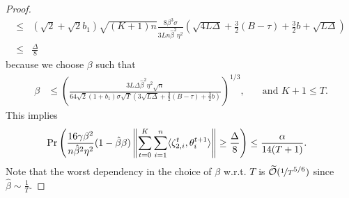 \documentclass[a4paper,11pt]{article}
\begin{document}
\begin{proof}
\begin{align*}
    \le &(\sqrt{2}+\sqrt{2}b_1)\sqrt{(K+1)n}\frac{8\beta^{3}\sigma}{3Ln\hat{\beta}^2\eta^2}\left(\sqrt{4L\Delta} + \frac{3}{2}(B-\tau)+\frac{3}{2}b + \sqrt{L\Delta}\right)\\
    \le &\frac{\Delta}{8}
    \end{align*}
    because we choose $\beta$ such that 
    \begin{align}\label{eq:stepsize_bound_5}
        \beta &\le \left(\frac{3L\Delta\hat{\beta}^2\eta^2\sqrt{n}}{64\sqrt{2}(1+b_1)\sigma\sqrt{T}\left(3\sqrt{L\Delta} + \frac{3}{2}(B-\tau)+\frac{3}{2}b\right)}\right)^{1/3},
        &\quad \text{and } K+1 \le T.
    \end{align}
    This implies 
    \begin{align*}
    &\Pr\left(\frac{16\gamma\beta^2}{n\hat{\beta}^2\eta^2}(1-\hat{\beta}\beta)\left\|\sum_{t=0}^K\sum_{i=1}^n\<\zeta_{2,i}^t,\theta^{t+1}_i>\right\| \ge \frac{\Delta}{8}\right) \le \frac{\alpha}{14(T+1)}.
    \end{align*}
    Note that the worst dependency in the choice of $\beta$ w.r.t. $T$ is $\widetilde{\mathcal O}(\nicefrac{1}{T}^{5/6})$ since $\hat{\beta} \sim \frac{1}{T}$.
    

\end{proof}
\end{document}
